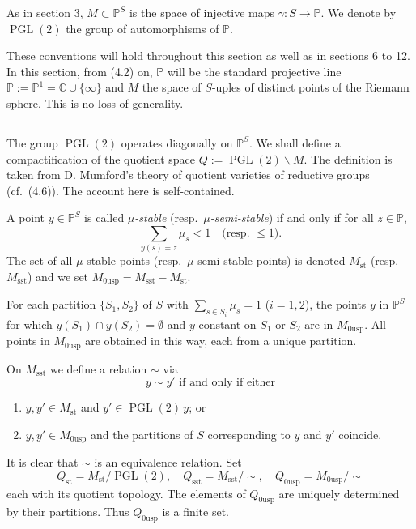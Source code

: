 \documentclass[12pt,a4paper]{article}
\theoremstyle{plain}
\theoremstyle{definition}
\theoremstyle{remark}
\DeclareMathOperator{\PGL}{PGL}
\newcommand{\CC}{\mathbb{C}}
\newcommand{\PP}{\mathbb{P}}
\numberwithin{equation}{section}
\providecommand{\CC}{\mathbb{C}}
\providecommand{\PP}{\mathbb{P}}
\providecommand{\PGL}{\operatorname{PGL}}
\begin{document}
As in section 3, $M \subset \PP^S$ is the space of injective maps $\gamma: S \to \PP$. We denote by $\PGL(2)$ the group of automorphisms of $\PP$.

These conventions will hold throughout this section as well as in sections 6 to 12. In this section, from (4.2) on, $\PP$ will be the standard projective line $\PP := \PP^1 = \CC \cup \{\infty\}$ and $M$ the space of $S$-uples of distinct points of the Riemann sphere. This is no loss of generality.

\subsection{}
The group $\PGL(2)$ operates diagonally on $\PP^S$. We shall define a compactification of the quotient space $Q := \PGL(2) \backslash M$. The definition is taken from D. Mumford's theory of quotient varieties of reductive groups (cf.\ (4.6)). The account here is self-contained.

A point $y \in \PP^S$ is called \emph{$\mu$-stable} (resp.\ \emph{$\mu$-semi-stable}) if and only if for all $z \in \PP$,
\begin{equation}\label{eq:4.1.1}
\sum_{y(s) = z} \mu_s < 1 \quad \text{(resp.\ $\leq 1$)}.
\end{equation}
The set of all $\mu$-stable points (resp.\ $\mu$-semi-stable points) is denoted $M_{\mathrm{st}}$ (resp.\ $M_{\mathrm{sst}}$) and we set $M_{0\mathrm{usp}} = M_{\mathrm{sst}} - M_{\mathrm{st}}$.

For each partition $\{S_1, S_2\}$ of $S$ with $\sum_{s \in S_i} \mu_s = 1$ ($i = 1, 2$), the points $y$ in $\PP^S$ for which $y(S_1) \cap y(S_2) = \emptyset$ and $y$ constant on $S_1$ or $S_2$ are in $M_{0\mathrm{usp}}$. All points in $M_{0\mathrm{usp}}$ are obtained in this way, each from a unique partition.

On $M_{\mathrm{sst}}$ we define a relation $\sim$ via
\[
y \sim y' \text{ if and only if either}
\]
\begin{enumerate}[label=\alph*)]
\item $y, y' \in M_{\mathrm{st}}$ and $y' \in \PGL(2) \, y$; or
\item $y, y' \in M_{0\mathrm{usp}}$ and the partitions of $S$ corresponding to $y$ and $y'$ coincide.
\end{enumerate}
It is clear that $\sim$ is an equivalence relation. Set
\[
Q_{\mathrm{st}} = M_{\mathrm{st}}/\PGL(2), \quad Q_{\mathrm{sst}} = M_{\mathrm{sst}}/\sim, \quad Q_{0\mathrm{usp}} = M_{0\mathrm{usp}}/\sim
\]
each with its quotient topology. The elements of $Q_{0\mathrm{usp}}$ are uniquely determined by their partitions. Thus $Q_{0\mathrm{usp}}$ is a finite set.
\end{document}
